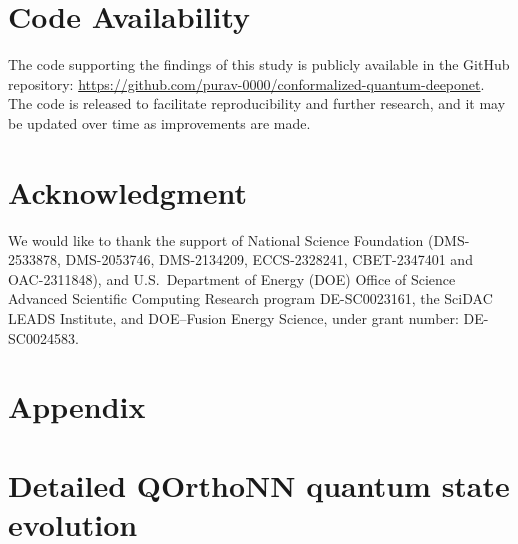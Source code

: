 \documentclass{iopjournal}
\begin{document}
\section*{Code Availability}
The code supporting the findings of this study is publicly available in the GitHub repository: \href{https://github.com/purav-0000/conformalized-quantum-deeponet}{https://github.com/purav-0000/conformalized-quantum-deeponet}. The code is released to facilitate reproducibility and further research, and it may be updated over time as improvements are made.

\section*{Acknowledgment}
We would like to thank the support of National Science Foundation (DMS-2533878, DMS-2053746, DMS-2134209, ECCS-2328241, CBET-2347401 and OAC-2311848), and U.S.~Department of Energy (DOE) Office of Science Advanced Scientific Computing Research program DE-SC0023161, the SciDAC LEADS Institute, and DOE–Fusion Energy Science, under grant number: DE-SC0024583.








\appendix
\section*{Appendix}

\section{Detailed QOrthoNN quantum state evolution}
\label{sec:quantum_state_evolution}
\end{document}
